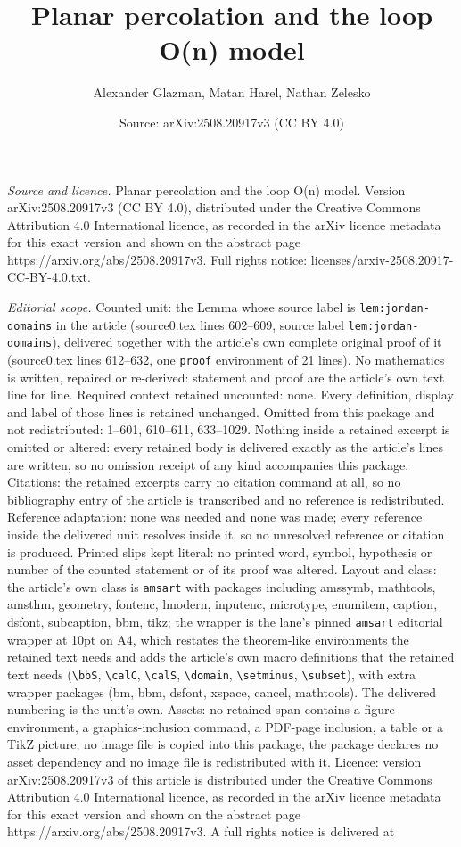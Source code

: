 \documentclass[10pt,a4paper]{amsart}
\title[Planar percolation and the loop O(n) model]{Planar percolation and the loop O(n) model}
\author{Alexander Glazman, Matan Harel, Nathan Zelesko}
\date{Source: arXiv:2508.20917v3 (CC BY 4.0)}
\begin{document}
\maketitle

\noindent\emph{Source and licence.} Planar percolation and the loop O(n) model. Version arXiv:2508.20917v3 (CC BY 4.0), distributed under the Creative Commons Attribution 4.0 International licence, as recorded in the arXiv licence metadata for this exact version and shown on the abstract page https://arxiv.org/abs/2508.20917v3. Full rights notice: licenses/arxiv-2508.20917-CC-BY-4.0.txt.\par\smallskip

\noindent\textit{Editorial scope.} Counted unit: the Lemma whose source label is \texttt{lem:jordan-domains} in the article (source0.tex lines 602--609, source label \texttt{lem:jordan-domains}), delivered together with the article's own complete original proof of it (source0.tex lines 612--632, one \texttt{proof} environment of 21 lines). No mathematics is written, repaired or re-derived: statement and proof are the article's own text line for line. Required context retained uncounted: none. Every definition, display and label of those lines is retained unchanged. Omitted from this package and not redistributed: 1--601, 610--611, 633--1029. Nothing inside a retained excerpt is omitted or altered: every retained body is delivered exactly as the article's lines are written, so no omission receipt of any kind accompanies this package. Citations: the retained excerpts carry no citation command at all, so no bibliography entry of the article is transcribed and no reference is redistributed. Reference adaptation: none was needed and none was made; every reference inside the delivered unit resolves inside it, so no unresolved reference or citation is produced. Printed slips kept literal: no printed word, symbol, hypothesis or number of the counted statement or of its proof was altered. Layout and class: the article's own class is \texttt{amsart} with packages including amssymb, mathtools, amsthm, geometry, fontenc, lmodern, inputenc, microtype, enumitem, caption, dsfont, subcaption, bbm, tikz; the wrapper is the lane's pinned \texttt{amsart} editorial wrapper at 10pt on A4, which restates the theorem-like environments the retained text needs and adds the article's own macro definitions that the retained text needs (\texttt{\textbackslash bbS}, \texttt{\textbackslash calC}, \texttt{\textbackslash calS}, \texttt{\textbackslash domain}, \texttt{\textbackslash setminus}, \texttt{\textbackslash subset}), with extra wrapper packages (bm, bbm, dsfont, xspace, cancel, mathtools). The delivered numbering is the unit's own. Assets: no retained span contains a figure environment, a graphics-inclusion command, a PDF-page inclusion, a table or a TikZ picture; no image file is copied into this package, the package declares no asset dependency and no image file is redistributed with it. Licence: version arXiv:2508.20917v3 of this article is distributed under the Creative Commons Attribution 4.0 International licence, as recorded in the arXiv licence metadata for this exact version and shown on the abstract page https://arxiv.org/abs/2508.20917v3. A full rights notice is delivered at 
\end{document}
